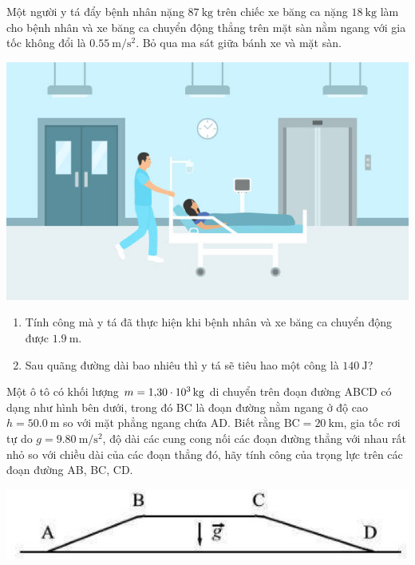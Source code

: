 \begin{ex}
	Một người y tá đẩy bệnh nhân nặng $\SI{87}{\kilogram}$ trên chiếc xe băng ca nặng $\SI{18}{\kilogram}$ làm cho bệnh nhân và xe băng ca chuyển động thẳng trên mặt sàn nằm ngang với gia tốc không đổi là $\SI{0.55}{\meter/\second^2}$. Bỏ qua ma sát giữa bánh xe và mặt sàn.
	\begin{center}
		\includegraphics[width=0.4\linewidth]{../figs/VN10-2023-PH-TP024-P-6}
	\end{center}
	\begin{enumerate}[label=\alph*)]
		\item Tính công mà y tá đã thực hiện khi bệnh nhân và xe băng ca chuyển động được $\SI{1.9}{\meter}$.
		\item Sau quãng đường dài bao nhiêu thì y tá sẽ tiêu hao một công là $\SI{140}{\joule}$?
	\end{enumerate}
\end{ex}
\begin{ex}
	Một ô tô có khối lượng $m=\SI{1.30E3}{\kilogram}$ di chuyển trên đoạn đường ABCD có dạng như hình bên dưới, trong đó BC là đoạn đường nằm ngang ở độ cao $h=\SI{50.0}{\meter}$ so với mặt phẳng ngang chứa AD. Biết rằng $\text{BC}=\SI{20}{\kilo\meter}$, gia tốc rơi tự do $g=\SI{9.80}{\meter/\second^2}$, độ dài các cung cong nối các đoạn đường thẳng với nhau rất nhỏ so với chiều dài của các đoạn thẳng đó, hãy tính công của trọng lực trên các đoạn đường AB, BC, CD.
	\begin{center}
		\includegraphics[width=0.4\linewidth]{../figs/VN10-2023-PH-TP024-P-7}
	\end{center}
\end{ex}
